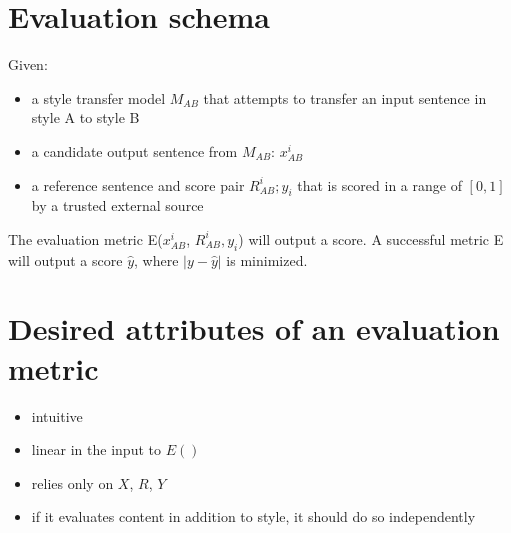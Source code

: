 \documentclass[12pt]{article}
\begin{document}
\section{Evaluation schema}

	Given:
	\begin{itemize}
		\item a style transfer model $M_{AB}$ that attempts to transfer an input sentence in style A to style B
		\item a candidate output sentence from $M_{AB}$:  $x_{AB}^i$
		\item a reference sentence and score pair $R_{AB}^i ; y_i$ that is scored in a range of $[0,1]$ by a trusted external source
	\end{itemize}

	The evaluation metric E($x_{AB}^i$, $R_{AB}^i, y_i$) will output a score. A successful metric E will output a score $\hat{y}$, where $|y-\hat{y}|$ is minimized.




\section{Desired attributes of an evaluation metric}
	\begin{itemize}
		\item intuitive
		\item linear in the input to $E()$
		\item relies only on $X$, $R$, $Y$
		\item if it evaluates content in addition to style, it should do so independently
	\end{itemize}
\end{document}
